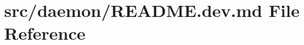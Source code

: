 \hypertarget{daemon_2README_8dev_8md}{}\section{src/daemon/\+R\+E\+A\+D\+ME.dev.\+md File Reference}
\label{daemon_2README_8dev_8md}
